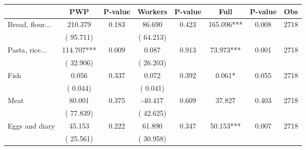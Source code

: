 
\begin{tabular}{l*{7}{c}}\hline&\multicolumn{1}{c}{PWP}&\multicolumn{1}{c}{P-value}&\multicolumn{1}{c}{Workers}&\multicolumn{1}{c}{P-value}&\multicolumn{1}{c}{Full}&\multicolumn{1}{c}{P-value}&\multicolumn{1}{c}{Obs} \\ \hline

 Bread, flour...       &            210.379       &        0.183  &             86.690       &        0.423  &            165.096***       &              0.008 &  2718 \\ 
                       &       (      95.711)             &                               &       (      64.213)                     &                               &                                               &                                &                      \\ 

 Pasta, rice...       &            114.707***       &        0.009  &              0.087       &        0.913  &             73.973***       &              0.001 &  2718 \\ 
                       &       (      32.906)             &                               &       (      26.203)                     &                               &                                               &                                &                      \\ 

 Fish       &              0.056       &        0.337  &              0.072       &        0.392  &              0.061*       &              0.055 &  2718 \\ 
                       &       (       0.044)             &                               &       (       0.041)                     &                               &                                               &                                &                      \\ 

 Meat       &             80.001       &        0.375  &            -40.417       &        0.609  &             37.827       &              0.403 &  2718 \\ 
                       &       (      77.839)             &                               &       (      42.625)                     &                               &                                               &                                &                      \\ 

 Eggs and diary       &             45.153       &        0.222  &             61.890       &        0.347  &             50.153***       &              0.007 &  2718 \\ 
                       &       (      25.561)             &                               &       (      30.958)                     &                               &                                               &                                &                      \\ 


\end{tabular}
